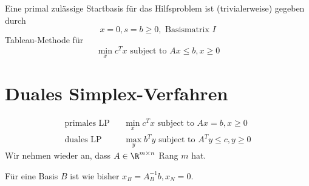 Eine primal zulässige Startbasis für das Hilfsproblem ist (trivialerweise) gegeben durch
\begin{equation*}
	x = 0, s = b \geq 0, \text{ Basismatrix } I
\end{equation*}
Tableau-Methode für %
\begin{equation*}
	\min_{x}c^Tx \text{ subject to } Ax \leq b , x \geq 0
\end{equation*}
\section{Duales Simplex-Verfahren}
\begin{align}
  \text{primales LP} && \min_{x}c^{T} x \text{ subject to }Ax = b, x \geq 0 \tag{P} \label{primalLP} \\
  \text{duales LP} && \max_{y}b^{T} y \text{ subject to }A^{T} y \leq c, y \geq 0 \tag{D}\label{dualLP}
\end{align}
Wir nehmen wieder an, dass $A \in \R^{m \times n}$ Rang $m$ hat.

Für eine Basis $B$ ist wie bisher $x_{B}= A^{-1}_{B}b, x_{N}=0$.

